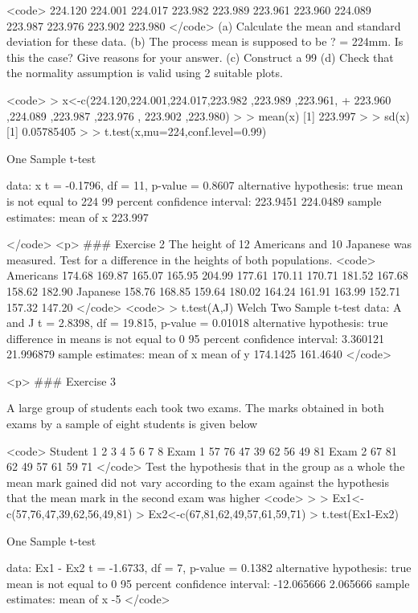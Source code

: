 <code>
224.120 	224.001 	224.017 	223.982 	223.989 	223.961
223.960 	224.089 	223.987 	223.976 	223.902 	223.980
</code>
(a) Calculate the mean and standard deviation for these data.
(b) The process mean is supposed to be ? = 224mm. Is this the
case? Give reasons for your answer.
(c) Construct a 99%
(d) Check that the normality assumption is valid using 2 suitable plots.

<code>
> x<-c(224.120,224.001,224.017,223.982 ,223.989 ,223.961,
+ 223.960 ,224.089 ,223.987 ,223.976 , 223.902 ,223.980)
>
> mean(x)
[1] 223.997
>
> sd(x)
[1] 0.05785405
>
> t.test(x,mu=224,conf.level=0.99)

 One Sample t-test

data:  x
t = -0.1796, df = 11, p-value = 0.8607
alternative hypothesis: true mean is not equal to 224
99 percent confidence interval:
 223.9451 224.0489
sample estimates:
mean of x
  223.997

</code>
<p>
### {Exercise 2} 
The height of 12 Americans and 10 Japanese was measured. Test for a difference in the heights of both populations.
<code>
Americans
174.68   	169.87 	   	165.07    	165.95 		204.99 		177.61 	
170.11 	 	170.71 	   	181.52 		167.68 		158.62 		182.90
Japanese
158.76  		168.85  		159.64  		180.02  		164.24
161.91  		163.99  		152.71  		157.32  		147.20
</code>
<code>
> t.test(A,J)
 Welch Two Sample t-test
data:  A and J
t = 2.8398, df = 19.815, p-value = 0.01018
alternative hypothesis: true difference in means is not equal to 0
95 percent confidence interval:
  3.360121 21.996879
sample estimates:
mean of x mean of y
 174.1425  161.4640
</code>

<p>
### {Exercise 3}

A large group of students each took two exams. The marks obtained in both exams by a sample of eight students is given below

<code>
Student	1	2	3	4	5	6	7	8
Exam 1	57	76	47	39	62	56	49	81
Exam 2	67	81	62	49	57	61	59	71
</code>
Test the hypothesis that in the group as a whole the mean mark gained did not vary according to the exam against the hypothesis that the mean mark in the second exam was higher
<code>
>
> Ex1<-c(57,76,47,39,62,56,49,81)
> Ex2<-c(67,81,62,49,57,61,59,71)
> t.test(Ex1-Ex2)

 One Sample t-test

data:  Ex1 - Ex2
t = -1.6733, df = 7, p-value = 0.1382
alternative hypothesis: true mean is not equal to 0
95 percent confidence interval:
 -12.065666   2.065666
sample estimates:
mean of x
-5
</code>

